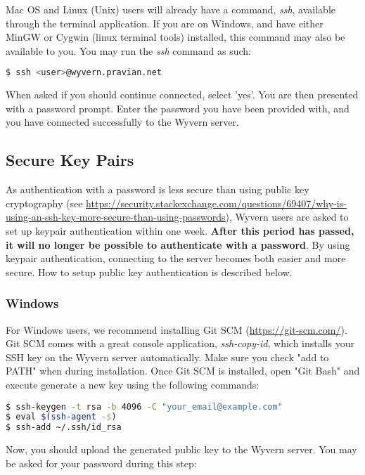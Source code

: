 \documentclass[a4paper]{article}
\begin{document}
\begin{appendices}
Mac OS and Linux (Unix) users will already have a command, \textit{ssh}, available through the terminal application. If you are on Windows, and have either MinGW or Cygwin (linux terminal tools) installed, this command may also be available to you. You may run the \textit{ssh} command as such:

\begin{lstlisting}[language=bash]
$ ssh <user>@wyvern.pravian.net
\end{lstlisting}

When asked if you should continue connected, select 'yes'. You are then presented with a password prompt. Enter the password you have been provided with, and you have connected successfully to the Wyvern server.

\subsection{Secure Key Pairs}
As authentication with a password is less secure than using public key cryptography (see \url{https://security.stackexchange.com/questions/69407/why-is-using-an-ssh-key-more-secure-than-using-passwords}), Wyvern users are asked to set up keypair authentication within one week. \textbf{After this period has passed, it will no longer be possible to authenticate with a password}. By using keypair authentication, connecting to the server becomes both easier and more secure. How to setup public key authentication is described below.

\subsubsection{Windows}
For Windows users, we recommend installing Git SCM (\url{https://git-scm.com/}). Git SCM comes with a great console application, \textit{ssh-copy-id}, which installs your SSH key on the Wyvern server automatically. Make sure you check "add to PATH" when during installation. Once Git SCM is installed, open "Git Bash" and execute generate a new key using the following commands:

\begin{lstlisting}[language=bash]
$ ssh-keygen -t rsa -b 4096 -C "your_email@example.com"
$ eval $(ssh-agent -s)
$ ssh-add ~/.ssh/id_rsa
\end{lstlisting}

Now, you should upload the generated public key to the Wyvern server. You may be asked for your password during this step:


\end{appendices}
\end{document}
